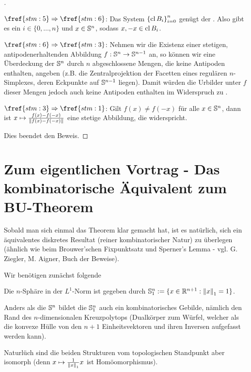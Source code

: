 \documentclass[10pt,a4paper]{article}
\begin{document}
\begin{proof}[]
\begin{implications}
            \item[$\fref{stm:5}\implies\fref{stm:6}$:]
        Das System ${\{\mathop\mathrm{cl}{B_i}\}}_{i=0}^n$ genügt der .
        Also gibt es ein $i\in\{0,\ldots,n\}$ und $x\in\mathbb{S}^n$, sodass $x,-x\in \mathop\mathrm{cl}{B_i}$.

            \item[$\fref{stm:6}\implies\fref{stm:3}$:]
        Nehmen wir die Existenz einer stetigen, antipodenerhaltenden Abbildung $f:\mathbb{S}^n\rightarrow\mathbb{S}^{n-1}$ an, so können wir eine Überdeckung der $\mathbb{S}^n$ durch $n$ abgeschlossene Mengen, die keine Antipoden enthalten, angeben (z.B. die Zentralprojektion der Facetten eines regulären $n$-Simplexes, deren Eckpunkte auf $\mathbb{S}^{n-1}$ liegen).
        Damit würden die Urbilder unter $f$ dieser Mengen jedoch auch keine Antipoden enthalten im Widerspruch zu .

            \item[$\fref{stm:3}\implies\fref{stm:1}$:]
        Gilt $f(x)\neq f(-x)$ für alle $x\in\mathbb{S}^n$, dann ist $x\mapsto \frac{f(x)-f(-x)}{\left\Vert f(x)-f(-x) \right\Vert}$ eine stetige Abbildung, die  widerspricht.
    \end{implications}
    Dies beendet den Beweis.
\end{proof}

\section{Zum eigentlichen Vortrag - Das kombinatorische Äquivalent zum BU-Theorem}

Sobald man sich einmal das Theorem klar gemacht hat, ist es natürlich, sich ein äquivalentes diskretes Resultat (reiner kombinatorischer Natur) zu überlegen (ähnlich wie beim Brouwer'schen Fixpunktsatz und Sperner's Lemma - vgl. G. Ziegler, M. Aigner, Buch der Beweise).

Wir benötigen zunächst folgende

\begin{definition}
Die $n$-Sphäre in der $L^1$-Norm ist gegeben durch $\mathbb{S}^n_1:=\{x\in\mathbb{R}^{n+1}:\left\Vert x \right\Vert_1=1\}$.
\end{definition}

Anders als die $\mathbb{S}^n$ bildet die $\mathbb{S}^n_1$ auch ein kombinatorisches Gebilde, nämlich den Rand des $n$-dimensionalen Kreuzpolytops (Dualkörper zum Würfel, welcher als die konvexe Hülle von den $n+1$ Einheitsvektoren und ihren Inversen aufgefasst werden kann).

Naturlüch sind die beiden Strukturen vom topologischen Standpunkt aber isomorph (denn $x\mapsto \frac{1}{\left\Vert x \right\Vert_1}x$ ist Homöomorphismus).
\end{document}
